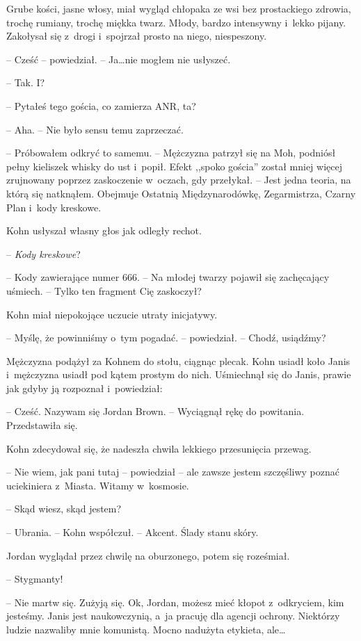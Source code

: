 \documentclass[oneside,polish,11pt,sfheadings]{mwbk}
\begin{document}
Grube kości, jasne włosy, miał wygląd chłopaka ze wsi bez prostackiego
zdrowia, trochę rumiany, trochę miękka twarz. Młody, bardzo intensywny i~lekko pijany. Zakołysał się z~drogi i~spojrzał prosto na niego,
niespeszony.

-- Cześć -- powiedział. -- Ja\ldots nie mogłem nie usłyszeć.

-- Tak. I?

-- Pytałeś tego gościa, co zamierza ANR, ta?

-- Aha. -- Nie było sensu temu zaprzeczać.

-- Próbowałem odkryć to samemu. -- Mężczyzna patrzył się na Moh, podniósł
pełny kieliszek whisky do ust i~popił. Efekt ,,spoko gościa'' został mniej
więcej zrujnowany poprzez zaskoczenie w~oczach, gdy przełykał. -- Jest
jedna teoria, na którą się natknąłem. Obejmuje Ostatnią Międzynarodówkę,
Zegarmistrza, Czarny Plan i~kody kreskowe.

Kohn usłyszał własny głos jak odległy rechot.

-- \emph{Kody kreskowe}?

-- Kody zawierające numer 666. -- Na młodej twarzy pojawił się zachęcający
uśmiech. -- Tylko ten fragment Cię zaskoczył?

Kohn miał niepokojące uczucie utraty inicjatywy.

-- Myślę, że powinniśmy o~tym pogadać. -- powiedział. -- Chodź, usiądźmy?

Mężczyzna podążył za Kohnem do stołu, ciągnąc plecak. Kohn usiadł koło
Janis i~mężczyzna usiadł pod kątem prostym do nich. Uśmiechnął się do
Janis, prawie jak gdyby ją rozpoznał i~powiedział: 

-- Cześć. Nazywam się
Jordan Brown. -- Wyciągnął rękę do powitania. Przedstawiła się.

Kohn zdecydował się, że nadeszła chwila lekkiego przesunięcia przewag.

-- Nie wiem, jak pani tutaj -- powiedział -- ale zawsze jestem szczęśliwy
poznać uciekiniera z~Miasta. Witamy w~kosmosie.

-- Skąd wiesz, skąd jestem?

-- Ubrania. -- Kohn współczuł. -- Akcent. Ślady stanu skóry.

Jordan wyglądał przez chwilę na oburzonego, potem się roześmiał.

-- Stygmanty!

-- Nie martw się. Zużyją się. Ok, Jordan, możesz mieć kłopot z~odkryciem,
kim jesteśmy. Janis jest naukowczynią, a~ja pracuję dla agencji ochrony.
Niektórzy ludzie nazwaliby mnie komunistą. Mocno nadużyta etykieta,
ale\ldots
\end{document}
